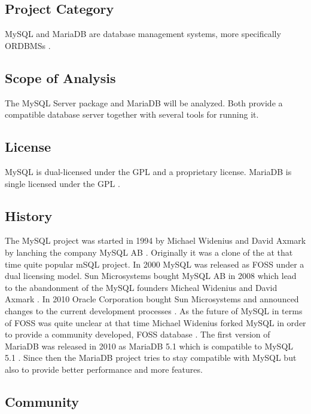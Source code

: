 \subsection{Project Category}

MySQL and MariaDB are database management systems, more specifically
\acp{ORDBMS} \cite{MySQLAbout}.

\subsection{Scope of Analysis}

The MySQL Server package and MariaDB will be analyzed. Both provide a
compatible database server together with several tools for running it.

\subsection{License}

MySQL is dual-licensed under the \ac{GPL} and a proprietary license. MariaDB is
single licensed under the \ac{GPL} \cite{MySQLLicense}.

\subsection{History}

The MySQL project was started in 1994 by Michael Widenius and David Axmark by
lanching the company MySQL AB \cite{MySQLHistory}. Originally it was a clone of
the at that time quite popular mSQL project. In 2000 MySQL was released as
\ac{FOSS} under a dual licensing model. Sun Microsystems bought MySQL AB in
2008 which lead to the abandonment of the MySQL founders Micheal Widenius and
David Axmark \cite{MySQLSun}. In 2010 Oracle Corporation bought Sun
Microsystems and announced changes to the current development processes
\cite{MySQLOracle}. As the future of MySQL in terms of \ac{FOSS} was quite
unclear at that time Michael Widenius forked MySQL in order to provide a
community developed, \ac{FOSS} database \cite{MySQLBehind}. The first version
of MariaDB was released in 2010 as MariaDB 5.1 which is compatible to MySQL 5.1
\cite{MySQLMariaDB5.1}. Since then the MariaDB project tries to stay compatible
with MySQL but also to provide better performance and more features.

\subsection{Community}

